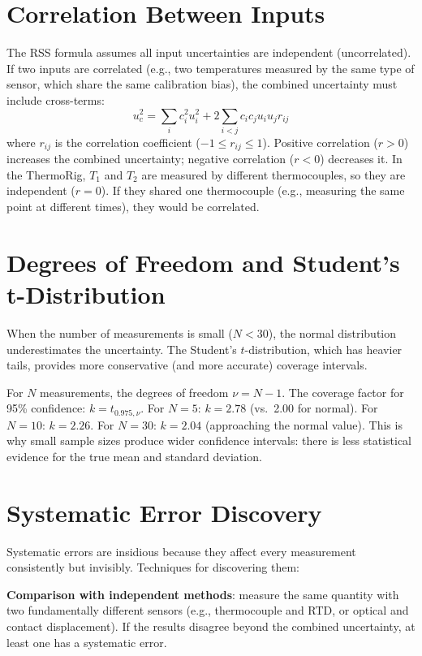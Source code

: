 \documentclass[11pt,letterpaper,twoside,openany]{book}
\begin{document}
\section{Correlation Between Inputs}
The RSS formula assumes all input uncertainties are independent (uncorrelated). If two inputs are correlated (e.g., two temperatures measured by the same type of sensor, which share the same calibration bias), the combined uncertainty must include cross-terms:
\begin{equation}
u_c^2 = \sum_i c_i^2 u_i^2 + 2\sum_{i<j} c_i c_j u_i u_j r_{ij}
\end{equation}
where $r_{ij}$ is the correlation coefficient ($-1 \leq r_{ij} \leq 1$). Positive correlation ($r > 0$) increases the combined uncertainty; negative correlation ($r < 0$) decreases it. In the ThermoRig, $T_1$ and $T_2$ are measured by different thermocouples, so they are independent ($r = 0$). If they shared one thermocouple (e.g., measuring the same point at different times), they would be correlated.

\section{Degrees of Freedom and Student's t-Distribution}
When the number of measurements is small ($N < 30$), the normal distribution underestimates the uncertainty. The Student's $t$-distribution, which has heavier tails, provides more conservative (and more accurate) coverage intervals.

For $N$ measurements, the degrees of freedom $\nu = N - 1$. The coverage factor for 95\% confidence: $k = t_{0.975, \nu}$. For $N = 5$: $k = 2.78$ (vs.\ 2.00 for normal). For $N = 10$: $k = 2.26$. For $N = 30$: $k = 2.04$ (approaching the normal value). This is why small sample sizes produce wider confidence intervals: there is less statistical evidence for the true mean and standard deviation.

\section{Systematic Error Discovery}
Systematic errors are insidious because they affect every measurement consistently but invisibly. Techniques for discovering them:

\textbf{Comparison with independent methods}: measure the same quantity with two fundamentally different sensors (e.g., thermocouple and RTD, or optical and contact displacement). If the results disagree beyond the combined uncertainty, at least one has a systematic error.
\end{document}
